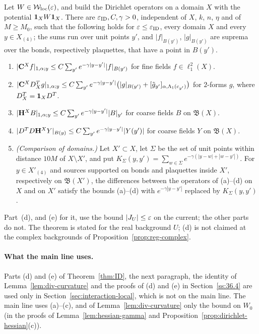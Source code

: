 \begin{theorem}\label{thm:ID}
Let $W\in\mathcal W_{\rm loc}(\varepsilon)$, and build the Dirichlet operators on a domain $X$ with the potential $\mathbf 1_XW\mathbf 1_X$. There are $\varepsilon_{\rm ID},C,\gamma>0$, independent of $X$, $k$, $n$, $\eta$ and of $M\ge M_0$, such that the following holds for $\varepsilon\le\varepsilon_{\rm ID}$, every domain $X$ and every $y\in X_{(4)}$; the sums run over unit points $y'$, and $|f|_{B(y')}$, $|g|_{B(y')}$ are suprema over the bonds, respectively plaquettes, that have a point in $B(y')$.
\begin{enumerate}[label=(\alph*)]
\item $|\mathbf C^Xf|_{1,\alpha;y}\le C\sum_{y'}e^{-\gamma|y-y'|}|f|_{B(y')}$ for fine fields $f\in\ell^2_1(X)$.
\item $|\mathbf C^XD^T_Xg|_{1,\alpha;y}\le C\sum_{y'}e^{-\gamma|y-y'|}\big(|g|_{B(y')}+[\tilde g_{y'}]_{\alpha,\Lambda_1(c_{y'})}\big)$ for $2$-forms $g$, where $D^T_X=\mathbf 1_XD^T$.
\item $|\mathbf H^XB|_{1,\alpha;y}\le C\sum_{y'}e^{-\gamma|y-y'|}|B|_{y'}$ for coarse fields $B$ on $\mathfrak B(X)$.
\item $|D^TD\mathbf H^XY|_{B(y)}\le C\sum_{y'}e^{-\gamma|y-y'|}|Y(y')|$ for coarse fields $Y$ on $\mathfrak B(X)$.
\item \emph{(Comparison of domains.)} Let $X'\subset X$, let $\Sigma$ be the set of unit points within distance $10M$ of $X\setminus X'$, and put $K_\Sigma(y,y')=\sum_{w\in\Sigma}e^{-\gamma(|y-w|+|w-y'|)}$. For $y\in X'_{(4)}$ and sources supported on bonds and plaquettes inside $X'$, respectively on $\mathfrak B(X')$, the differences between the operators of (a)--(d) on $X$ and on $X'$ satisfy the bounds (a)--(d) with $e^{-\gamma|y-y'|}$ replaced by $K_\Sigma(y,y')$.
\end{enumerate}
Part~(d), and (e) for it, use the bound $|J_U|\le\varepsilon$ on the current; the other parts do not. The theorem is stated for the real background $U$; (d) is not claimed at the complex backgrounds of Proposition~\ref{prop:reg-complex}.
\end{theorem}

\paragraph{What the main line uses.} Parts (d) and (e) of Theorem~\ref{thm:ID}, the next paragraph, the identity of Lemma~\ref{lem:div-curvature} and the proofs of (d) and (e) in Section~\ref{ss:36.4} are used only in Section~\ref{sec:interaction-local}, which is not on the main line. The main line uses (a)--(c), and of Lemma~\ref{lem:div-curvature} only the bound on $W_0$ (in the proofs of Lemma~\ref{lem:hessian-gamma} and Proposition~\ref{prop:dirichlet-hessian}(c)).


